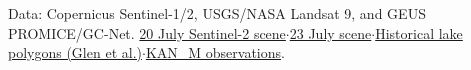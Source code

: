 \documentclass[10pt,a4paper]{article}
\newcommand{\captiontext}[1]{{\small\color{muted}#1}\par}
\begin{document}
\captiontext{Data: Copernicus Sentinel-1/2, USGS/NASA Landsat 9, and GEUS PROMICE/GC-Net. \href{https://earth-search.aws.element84.com/v1/collections/sentinel-2-l2a/items/S2C_22WFV_20260720_0_L2A}{20 July Sentinel-2 scene}\enspace$\cdot$\enspace\href{https://earth-search.aws.element84.com/v1/collections/sentinel-2-l2a/items/S2C_22WFV_20260723_0_L2A}{23 July scene}\enspace$\cdot$\enspace\href{https://zenodo.org/records/16577959}{Historical lake polygons (Glen et al.)}\enspace$\cdot$\enspace\href{https://thredds.geus.dk/thredds/dodsC/aws/l3sites/netcdf/hour/KAN_M_hour.nc.html}{KAN\_M observations}.}
\end{document}
